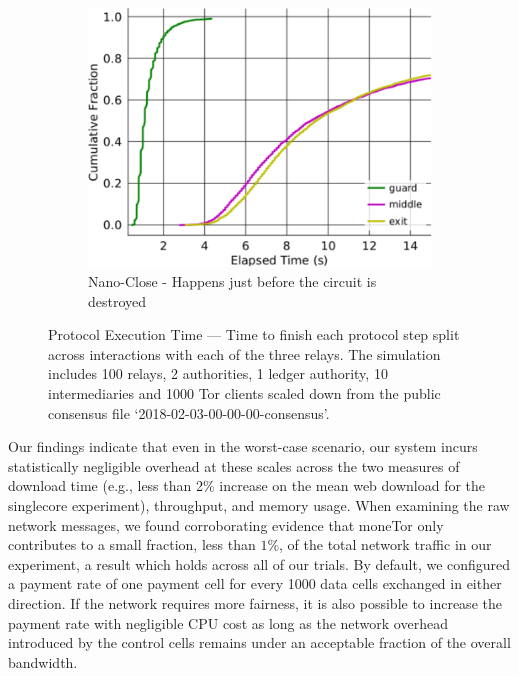 \begin{figure}[t]
\begin{subfigure}[t]{0.32\textwidth}
    \label{fig:ttfp}
  \end{subfigure}
  \begin{subfigure}[t]{0.32\textwidth} \centering
    \includegraphics[trim={0 0cm 0 0cm}, clip, width=1.0\textwidth]{images/payment_close.pdf}
    \caption{Nano-Close - Happens just before the circuit is destroyed}
    \label{fig:payments_close}
  \end{subfigure}
  \caption{Protocol Execution Time --- Time to finish each protocol step split across interactions with each of the three relays.
    The simulation includes 100 relays, 2 authorities, 1 ledger authority, 10 intermediaries and 1000 Tor clients scaled down from the public consensus file `2018-02-03-00-00-00-consensus'.}
  \label{fig:latencymeasurements}
\end{figure}

Our findings indicate that even in the worst-case scenario, our system incurs statistically negligible overhead at these scales across the two measures of download time (e.g., less than 2\% increase on the mean web download for the singlecore experiment), throughput, and memory usage.
When examining the raw network messages, we found corroborating evidence that moneTor only contributes to a small fraction, less than $1\%$, of the total network traffic in our experiment, a result which holds across all of our trials.
By default, we configured a payment rate of one payment cell for every 1000 data cells exchanged in either direction.
If the network requires more fairness, it is also possible to increase the payment rate with negligible CPU cost as long as the network overhead introduced by the control cells remains under an acceptable fraction of the overall bandwidth.

